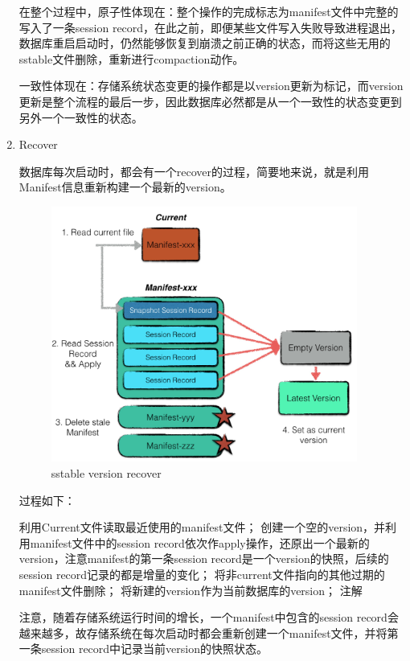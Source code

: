 \begin{enumerate}
在整个过程中，原子性体现在：整个操作的完成标志为manifest文件中完整的写入了一条session record，在此之前，即便某些文件写入失败导致进程退出，数据库重启启动时，仍然能够恢复到崩溃之前正确的状态，而将这些无用的sstable文件删除，重新进行compaction动作。

一致性体现在：存储系统状态变更的操作都是以version更新为标记，而version更新是整个流程的最后一步，因此数据库必然都是从一个一致性的状态变更到另外一个一致性的状态。


		\item Recover

数据库每次启动时，都会有一个recover的过程，简要地来说，就是利用Manifest信息重新构建一个最新的version。

\begin{figure}[H]
	\centering
	\includegraphics[width=0.95\textwidth]{images/version_recover.jpeg}
	\caption{sstable version recover}
	\label{sstable_version_recover}
\end{figure}

过程如下：

利用Current文件读取最近使用的manifest文件；
创建一个空的version，并利用manifest文件中的session record依次作apply操作，还原出一个最新的version，注意manifest的第一条session record是一个version的快照，后续的session record记录的都是增量的变化；
将非current文件指向的其他过期的manifest文件删除；
将新建的version作为当前数据库的version；
注解

注意，随着存储系统运行时间的增长，一个manifest中包含的session record会越来越多，故存储系统在每次启动时都会重新创建一个manifest文件，并将第一条session record中记录当前version的快照状态。


\end{enumerate}
